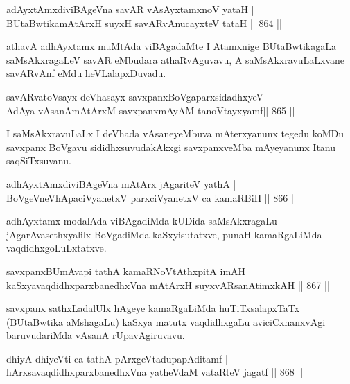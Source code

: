 \begin{shl}
adAyxtAmxdiviBAgeVna savAR vA\s sAyx\s \s tamxnoV yataH | \\
BUtaBwtikamAtArxH suyxH savARvAnucayxteV tataH \hfill||  864 ||  
\end{shl}

\begin{artha}
athavA adhAyxtamx muMtAda viBAgadaMte I Atamxnige BUtaBwtikagaLa saMsAkxragaLeV savAR eMbudara athaRvAguvavu, A saMsAkxravuLaLxvane savARvAnf eMdu heVLalapxDuvadu.
\end{artha}

\begin{shl}
savARvatoV\s sayx deVhasayx savxpanxBoVgaparxsidadhxyeV | \\
AdAya vAsanAmAtArxM savxpanxmAyAM tanoVtayxyamf\hfill ||  865 ||  
\end{shl}

\begin{artha}
I saMsAkxravuLaLx I deVhada vAsaneyeMbuva mAterxyanunx tegedu koMDu savxpanx BoVgavu sididhxsuvudakAkxgi savxpanxveMba mAyeyanunx Itanu saqSiTxsuvanu.
\end{artha}

\begin{shl}
adhAyxtAmxdiviBAgeVna mAtArx jAgariteV yathA | \\
BoVgeVneVhApaciVyanetxV parxciVyanetxV ca kamaRBiH \hfill||  866 || 
\end{shl}

\begin{artha}
adhAyxtamx modalAda viBAgadiMda kUDida saMsAkxragaLu jAgarAvasethxyalilx BoVgadiMda kaSxyisutatxve, punaH kamaRgaLiMda vaqdidhxgoLuLxtatxve.
\end{artha}

\begin{shl}
savxpanxBUmAvapi tathA kamaRNoVtAthxpitA imAH | \\
kaSxyavaqdidhxparxbanedhxVna mAtArxH suyxvARsanAtimxkAH \hfill||  867 ||  
\end{shl}

\begin{artha}
savxpanx sathxLadalUlx hAgeye kamaRgaLiMda huTiTxsalapxTaTx (BUtaBwtika aMshagaLu) kaSxya matutx vaqdidhxgaLu aviciCxnanxvAgi baruvudariMda vAsanA rUpavAgiruvavu.
\end{artha}

\begin{shl}
dhiyA dhiyeVti ca tathA pArxgeVtadupapAditamf | \\
hArxsavaqdidhxparxbanedhxVna yatheVdaM vataRteV jagatf \hfill||  868 ||  
\end{shl}


